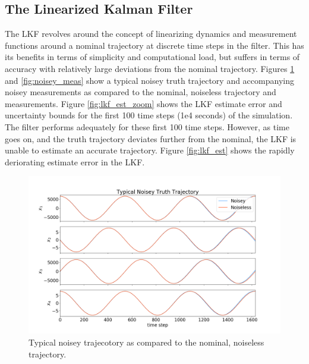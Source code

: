 \documentclass[11pt, a4paper]{article}
\begin{document}
\subsection{The Linearized Kalman Filter}
The LKF revolves around the concept of linearizing dynamics and measurement functions around a nominal trajectory at discrete time steps in the filter. 
This has its benefits in terms of simplicity and computational load, but suffers in terms of accuracy with relatively large deviations from the nominal trajectory. 
Figures \ref{fig:noisey_states} and \ref{fig:noisey_meas} show a typical noisey truth trajectory and accompanying noisey measurements as compared to the nominal, noiseless trajectory and measurements.  
Figure \ref{fig:lkf_est_zoom} shows the LKF estimate error and uncertainty bounds for the first 100 time steps (1e4 seconds) of the simulation. 
The filter performs adequately for these first 100 time steps.
However, as time goes on, and the truth trajectory deviates further from the nominal, the LKF is unable to estimate an accurate trajectory. 
Figure \ref{fig:lkf_est} shows the rapidly deriorating estimate error in the LKF.  
\begin{figure}[H]
	\centering
	\includegraphics[width=\textwidth]{Figures/noisey_truth.png}
	\caption{Typical noisey trajecotory as compared to the nominal, noiseless trajectory.}
	\label{fig:noisey_states}
\end{figure}
\end{document}
